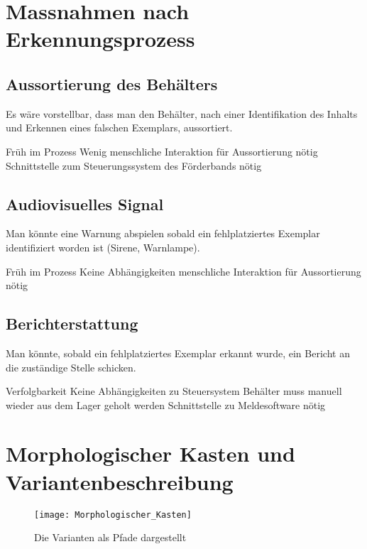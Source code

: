 \section{Massnahmen nach Erkennungsprozess}

\subsection{Aussortierung des Behälters}
Es wäre vorstellbar, dass man den Behälter, nach einer Identifikation des Inhalts und Erkennen eines falschen Exemplars, aussortiert.
\begin{itemize}
	\pro Früh im Prozess
	\pro Wenig menschliche Interaktion für Aussortierung nötig
	\con Schnittstelle zum Steuerungssystem des Förderbands nötig
\end{itemize}

\subsection{Audiovisuelles Signal}
Man könnte eine Warnung abspielen sobald ein fehlplatziertes Exemplar identifiziert worden ist (Sirene, Warnlampe).
\begin{itemize}
	\pro Früh im Prozess
	\pro Keine Abhängigkeiten
	\con menschliche Interaktion für Aussortierung nötig
\end{itemize}

\subsection{Berichterstattung}
Man könnte, sobald ein fehlplatziertes Exemplar erkannt wurde, ein Bericht an die zuständige Stelle schicken.
\begin{itemize}
	\pro Verfolgbarkeit
	\pro Keine Abhängigkeiten zu Steuersystem
	\con Behälter muss manuell wieder aus dem Lager geholt werden
	\con Schnittstelle zu Meldesoftware nötig
\end{itemize}

\newpage

\section{Morphologischer Kasten und Variantenbeschreibung}

\begin{figure}[h!]
	\texttt{[image: Morphologischer\_Kasten]}
	\caption{Die Varianten als Pfade dargestellt}
	\label{fig:MorphKasten}
\end{figure}

